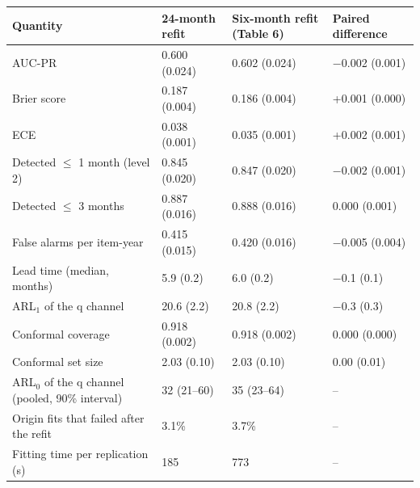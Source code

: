 \documentclass[10pt,a4paper]{article}
\begin{document}
\noindent\begin{minipage}{\linewidth}
\label{tab:S10a}
\centering\footnotesize
\begin{tabular}{llll}
\toprule
Quantity & 24-month refit & Six-month refit (Table 6) & Paired difference \\ \midrule
AUC-PR & 0.600 (0.024) & 0.602 (0.024) & −0.002 (0.001) \\
Brier score & 0.187 (0.004) & 0.186 (0.004) & +0.001 (0.000) \\
ECE & 0.038 (0.001) & 0.035 (0.001) & +0.002 (0.001) \\
Detected $\le$ 1 month (level 2) & 0.845 (0.020) & 0.847 (0.020) & −0.002 (0.001) \\
Detected $\le$ 3 months & 0.887 (0.016) & 0.888 (0.016) & 0.000 (0.001) \\
False alarms per item-year & 0.415 (0.015) & 0.420 (0.016) & −0.005 (0.004) \\
Lead time (median, months) & 5.9 (0.2) & 6.0 (0.2) & −0.1 (0.1) \\
ARL$_1$ of the q channel & 20.6 (2.2) & 20.8 (2.2) & −0.3 (0.3) \\
Conformal coverage & 0.918 (0.002) & 0.918 (0.002) & 0.000 (0.000) \\
Conformal set size & 2.03 (0.10) & 2.03 (0.10) & 0.00 (0.01) \\
ARL$_0$ of the q channel (pooled, 90\% interval) & 32 (21–60) & 35 (23–64) & – \\
Origin fits that failed after the refit & 3.1\% & 3.7\% & – \\
Fitting time per replication (s) & 185 & 773 & – \\
\bottomrule
\end{tabular}
\end{minipage}
\vspace{22pt}
\end{document}
